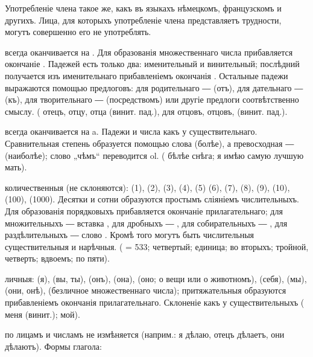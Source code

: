 {\footnotesize {} Употребленіе члена такое же, какъ въ языкахъ нѣмецкомъ, французскомъ и другихъ. Лица, для которыхъ употребленіе члена представляетъ трудности, могутъ совершенно его не употреблять.}
    
     всегда оканчивается на . Для образованія множественнаго числа прибавляется окончаніе . Падежей есть только два: именительный и винительный; послѣдний получается изъ именительнаго прибавленіемъ окончанія . Остальные падежи выражаются помощью предлоговъ: для родительнаго ―  (отъ), для дательнаго ―  (къ), для творительнаго ―  (посредствомъ) или другіе предлоги соотвѣтственно смыслу. (  отецъ,  отцу,  отца (винит. пад.),  для отцовъ,  отцовъ, (винит. пад.).
    
     всегда оканчивается на a. Падежи и числа какъ у существительнаго. Сравнительная степень образуется помощью слова  (болѣе), а превосходная ―  (наиболѣе); слово „чѣмъ“ переводится ol. (  бѣлѣе снѣга;  я имѣю самую лучшую мать).
    
     количественныя (не склоняются):  (1),  (2),  (3),  (4),  (5)  (6),  (7),  (8),  (9),  (10),  (100),  (1000). Десятки и сотни образуются простымъ сліяніемъ числительныхъ. Для образованія порядковыхъ прибавляется окончаніе прилагательнаго; для множительныхъ ― вставка , для дробныхъ ― , для собирательныхъ ― , для раздѣлительныхъ ― слово . Кромѣ того могутъ быть числительныя существительныя и нарѣчныя. (  = 533;  четвертый;  единица;  во вторыхъ;  тройной,  четверть;  вдвоемъ;  по пяти).
    
     личныя:  (я),  (вы, ты),  (онъ),  (она),  (оно; о вещи или о животномъ),  (себя),  (мы),  (они, онѣ),  (безличное множественнаго числа); притяжательныя образуются прибавленіемъ окончанія прилагательнаго. Склоненіе какъ у существительныхъ (  меня (винит.);  мой).
    
     по лицамъ и числамъ не измѣняется (наприм.:  я дѣлаю,  отецъ дѣлаетъ,  они дѣлаютъ). Формы глагола:
    
